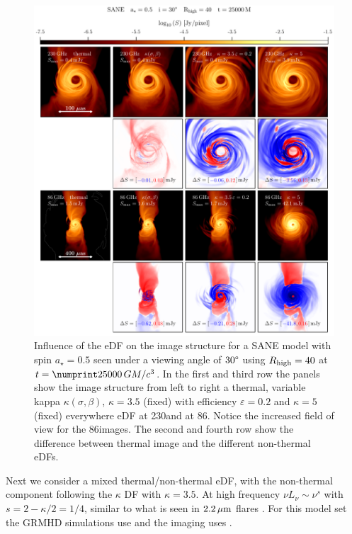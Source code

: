 \begin{figure}
  \centering
  \includegraphics[width=\textwidth]{./figures/SANE_eDFs_diff_cbar.pdf}
  \caption{Influence of the eDF on the image structure for a SANE model with spin $a_{\star}=0.5$ seen under a viewing angle of $30\degree$ using $R_\mathrm{high} = 40$ at $t = \no{25000}\,\tg$.
    In the first and third row the panels show the image structure from left to right a thermal, variable kappa $\kappa(\sigma,\beta)$, $\kappa=3.5$ (fixed) with efficiency $\varepsilon=0.2$ and $\kappa=5$ (fixed) everywhere eDF at 230\GHz and at 86\GHz.
    Notice the increased field of view for the 86\GHz images.
    The second and fourth row show the difference between thermal image and the different non-thermal eDFs.}
  \label{fig:SANE_edfs}
\end{figure}

Next we consider a mixed thermal/non-thermal eDF, with the non-thermal component following the $\kappa$ DF with $\kappa = 3.5$.
At high frequency $\nu L_\nu \sim \nu^s$ with $s = 2 - \kappa/2 = 1/4$, similar to what is seen in $2.2\,\mu\mathrm{m}$ flares \citep{2007ApJ...667..900H}.
For this model set the GRMHD simulations use \bhac and the imaging uses \bhoss.

